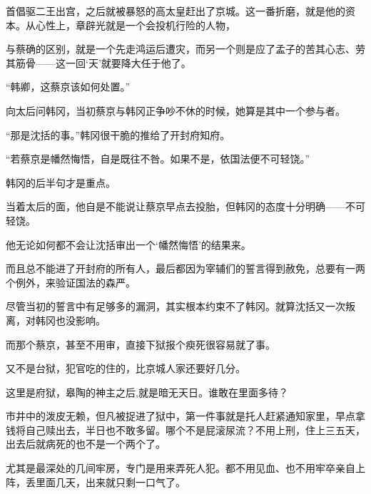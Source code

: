 首倡驱二王出宫，之后就被暴怒的高太皇赶出了京城。这一番折磨，就是他的资本。从心性上，章辟光就是一个会投机行险的人物，

与蔡确的区别，就是一个先走鸿运后遭灾，而另一个则是应了孟子的苦其心志、劳其筋骨——这一回‘天’就要降大任于他了。

“韩卿，这蔡京该如何处置。”

向太后问韩冈，当初蔡京与韩冈正争吵不休的时候，她算是其中一个参与者。

“那是沈括的事。”韩冈很干脆的推给了开封府知府。

“若蔡京是幡然悔悟，自是既往不咎。如果不是，依国法便不可轻饶。”

韩冈的后半句才是重点。

当着太后的面，他自是不能说让蔡京早点去投胎，但韩冈的态度十分明确——不可轻饶。

他无论如何都不会让沈括审出一个‘幡然悔悟’的结果来。

而且总不能进了开封府的所有人，最后都因为宰辅们的誓言得到赦免，总要有一两个例外，来验证国法的森严。

尽管当初的誓言中有足够多的漏洞，其实根本约束不了韩冈。就算沈括又一次叛离，对韩冈也没影响。

而那个蔡京，甚至不用审，直接下狱报个瘐死很容易就了事。

又不是台狱，犯官吃的住的，比京城人家还要好几分。

这里是府狱，皋陶的神主之后,就是暗无天日。谁敢在里面多待？

市井中的泼皮无赖，但凡被捉进了狱中，第一件事就是托人赶紧通知家里，早点拿钱将自己赎出去，半日也不敢多留。哪个不是屁滚尿流？不用上刑，住上三五天，出去后就病死的也不是一个两个了。

尤其是最深处的几间牢房，专门是用来弄死人犯。都不用见血、也不用牢卒亲自上阵，丢里面几天，出来就只剩一口气了。

